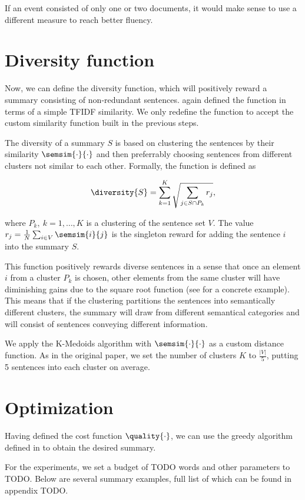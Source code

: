If an event consisted of only one or two documents, it would make sense to use a different measure to reach better fluency.

\section{Diversity function}

Now, we can define the diversity function, which will positively reward a summary consisting of non-redundant sentences. \cite{multi-summarization-2} again defined the function in terms of a simple TFIDF similarity. We only redefine the function to accept the custom similarity function built in the previous steps.

The diversity of a summary $S$ is based on clustering the sentences by their similarity $\semsim{\cdot}{\cdot}$ and then preferrably choosing sentences from different clusters not similar to each other. Formally, the function is defined as

\begin{equation}
	\diversity{S} = \sum_{k = 1}^{K} \sqrt{\sum_{j \in S \cap P_{k}} r_{j}},
\end{equation}

where $P_{k},\ k = 1, \dots, K$ is a clustering of the sentence set $V$. The value $r_{j} = \frac{1}{N} \sum_{i \in V} \semsim{i}{j}$ is the singleton reward for adding the sentence $i$ into the summary $S$.

This function positively rewards diverse sentences in a sense that once an element $i$ from a cluster $P_{k}$ is chosen, other elements from the same cluster will have diminishing gains due to the square root function (see \cite{multi-summarization-2} for a concrete example). This means that if the clustering partitions the sentences into semantically different clusters, the summary will draw from different semantical categories and will consist of sentences conveying different information.

We apply the K-Medoids algorithm with $\semsim{\cdot}{\cdot}$ as a custom distance function. As in the original paper, we set the number of clusters $K$ to $\frac{\left| V \right|}{5}$, putting 5 sentences into each cluster on average.


\section{Optimization}
Having defined the cost function $\quality{\cdot}$, we can use the greedy algorithm defined in \cite{multi-summarization-1} to obtain the desired summary.

For the experiments, we set a budget of {\color{red} TODO} words and other parameters to {\color{red} TODO}. Below are several summary examples, full list of which can be found in appendix {\color{red} TODO}.